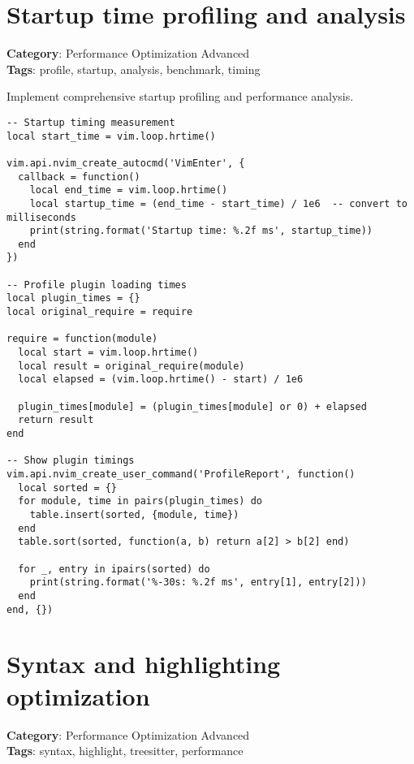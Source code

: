 {{{{{{{{{\section{Startup time profiling and analysis}

\textbf{Category}: Performance Optimization Advanced\\ \textbf{Tags}: profile, startup, analysis, benchmark, timing
\vspace{0.5cm}

Implement comprehensive startup profiling and performance analysis.

\begin{Exa*}{}
\begin{Verbatim}[fontsize=\footnotesize, breaklines, breakanywhere]
-- Startup timing measurement
local start_time = vim.loop.hrtime()

vim.api.nvim_create_autocmd('VimEnter', {
  callback = function()
    local end_time = vim.loop.hrtime()
    local startup_time = (end_time - start_time) / 1e6  -- convert to milliseconds
    print(string.format('Startup time: %.2f ms', startup_time))
  end
})

-- Profile plugin loading times
local plugin_times = {}
local original_require = require

require = function(module)
  local start = vim.loop.hrtime()
  local result = original_require(module)
  local elapsed = (vim.loop.hrtime() - start) / 1e6
  
  plugin_times[module] = (plugin_times[module] or 0) + elapsed
  return result
end

-- Show plugin timings
vim.api.nvim_create_user_command('ProfileReport', function()
  local sorted = {}
  for module, time in pairs(plugin_times) do
    table.insert(sorted, {module, time})
  end
  table.sort(sorted, function(a, b) return a[2] > b[2] end)
  
  for _, entry in ipairs(sorted) do
    print(string.format('%-30s: %.2f ms', entry[1], entry[2]))
  end
end, {})
\end{Verbatim}
\end{Exa*}

\section{Syntax and highlighting optimization}

\textbf{Category}: Performance Optimization Advanced\\ \textbf{Tags}: syntax, highlight, treesitter, performance
\vspace{0.5cm}

}}}}}}}}}
